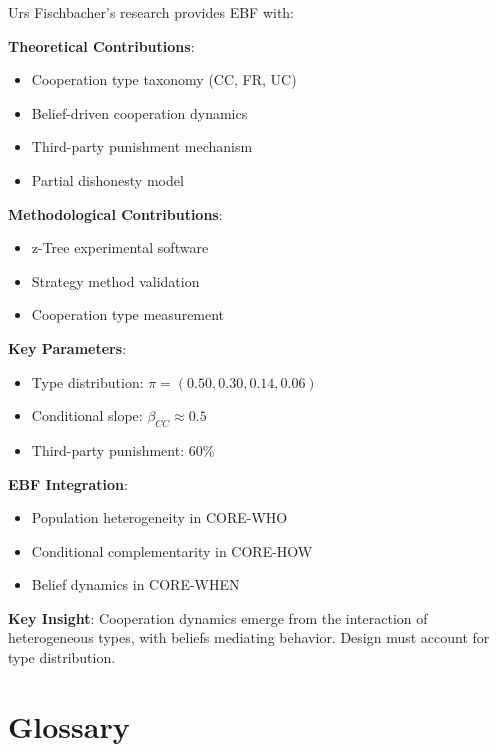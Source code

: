 \begin{tcolorbox}[colback=gray!5!white,colframe=gray!75!black,title=Chapter Summary]
Urs Fischbacher's research provides EBF with:

\textbf{Theoretical Contributions}:
\begin{itemize}
    \item Cooperation type taxonomy (CC, FR, UC)
    \item Belief-driven cooperation dynamics
    \item Third-party punishment mechanism
    \item Partial dishonesty model
\end{itemize}

\textbf{Methodological Contributions}:
\begin{itemize}
    \item z-Tree experimental software
    \item Strategy method validation
    \item Cooperation type measurement
\end{itemize}

\textbf{Key Parameters}:
\begin{itemize}
    \item Type distribution: $\pi = (0.50, 0.30, 0.14, 0.06)$
    \item Conditional slope: $\beta_{CC} \approx 0.5$
    \item Third-party punishment: 60\%
\end{itemize}

\textbf{EBF Integration}:
\begin{itemize}
    \item Population heterogeneity in CORE-WHO
    \item Conditional complementarity in CORE-HOW
    \item Belief dynamics in CORE-WHEN
\end{itemize}

\textbf{Key Insight}: Cooperation dynamics emerge from the interaction of heterogeneous types, with beliefs mediating behavior. Design must account for type distribution.
\end{tcolorbox}

\section{Glossary}

